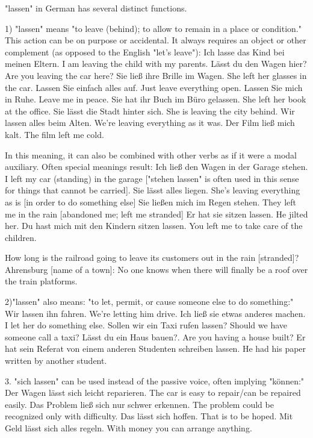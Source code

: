 \documentclass[a4paper,12pt]{article}
\begin{document}
\begin{adjustwidth}{2em}{0pt}
\begin{adjustwidth}{3em}{0pt}
"lassen" in German has several distinct functions.

    1) "lassen" means "to leave (behind); to allow to remain in a place or condition." This action can be on purpose or accidental. It always requires an object or other complement (as opposed to the English "let's leave"):
    Ich lasse das Kind bei meinen Eltern. 	I am leaving the child with my parents.
    Lässt du den Wagen hier? 	Are you leaving the car here?
    Sie ließ ihre Brille im Wagen. 	She left her glasses in the car.
    Lassen Sie einfach alles auf. 	Just leave everything open.
    Lassen Sie mich in Ruhe. 	Leave me in peace.
    Sie hat ihr Buch im Büro gelassen. 	She left her book at the office.
    Sie lässt die Stadt hinter sich. 	She is leaving the city behind.
    Wir lassen alles beim Alten. 	We're leaving everything as it was.
    Der Film ließ mich kalt. 	The film left me cold.

    In this meaning, it can also be combined with other verbs as if it were a modal auxiliary. Often special meanings result:
    Ich ließ den Wagen in der Garage stehen. 	I left my car (standing) in the garage
    ["stehen lassen" is often used in this sense for things that cannot be carried].
    Sie lässt alles liegen. 	She's leaving everything as is [in order to do something else]
    Sie ließen mich im Regen stehen. 	They left me in the rain [abandoned me; left me stranded]
    Er hat sie sitzen lassen. 	He jilted her.
    Du hast mich mit den Kindern sitzen lassen. 	You left me to take care of the children.


 
	
  	How long is the railroad going to leave its customers out in the rain [stranded]?
Ahrensburg [name of a town]: No one knows when there will finally be a roof over the train platforms.
 

    2)"lassen" also means: "to let, permit, or cause someone else to do something:"
    Wir lassen ihn fahren. 	We're letting him drive.
    Ich ließ sie etwas anderes machen. 	I let her do something else.
    Sollen wir ein Taxi rufen lassen? 	Should we have someone call a taxi?
    Lässt du ein Haus bauen?. 	Are you having a house built?
    Er hat sein Referat von einem anderen Studenten schreiben lassen. 	He had his paper written by another student.

    3. "sich lassen" can be used instead of the passive voice, often implying "können:"
    Der Wagen lässt sich leicht reparieren. 	The car is easy to repair/can be repaired easily.
    Das Problem ließ sich nur schwer erkennen. 	The problem could be recognized only with difficulty.
    Das lässt sich hoffen. 	That is to be hoped.
    Mit Geld lässt sich alles regeln. 	With money you can arrange anything.


\end{adjustwidth}
\end{adjustwidth}
\end{document}

